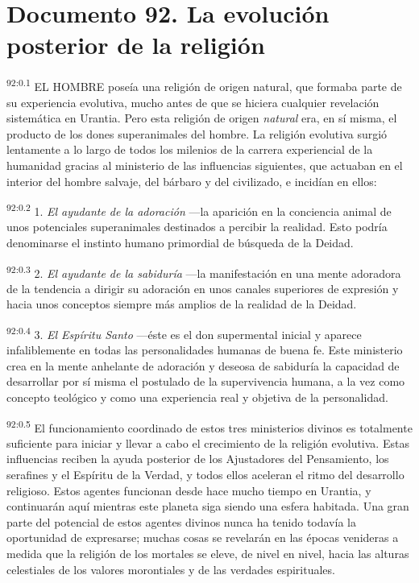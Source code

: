 \chapter{Documento 92. La evolución posterior de la religión}
\par
\textsuperscript{92:0.1} EL HOMBRE poseía una religión de origen natural, que formaba parte de su experiencia evolutiva, mucho antes de que se hiciera cualquier revelación sistemática en Urantia. Pero esta religión de origen \textit{natural} era, en sí misma, el producto de los dones superanimales del hombre. La religión evolutiva surgió lentamente a lo largo de todos los milenios de la carrera experiencial de la humanidad gracias al ministerio de las influencias siguientes, que actuaban en el interior del hombre salvaje, del bárbaro y del civilizado, e incidían en ellos:

\par
\textsuperscript{92:0.2} 1. \textit{El ayudante de la adoración} ---la aparición en la conciencia animal de unos potenciales superanimales destinados a percibir la realidad. Esto podría denominarse el instinto humano primordial de búsqueda de la Deidad.

\par
\textsuperscript{92:0.3} 2. \textit{El ayudante de la sabiduría} ---la manifestación en una mente adoradora de la tendencia a dirigir su adoración en unos canales superiores de expresión y hacia unos conceptos siempre más amplios de la realidad de la Deidad.

\par
\textsuperscript{92:0.4} 3. \textit{El Espíritu Santo} ---éste es el don supermental inicial y aparece infaliblemente en todas las personalidades humanas de buena fe. Este ministerio crea en la mente anhelante de adoración y deseosa de sabiduría la capacidad de desarrollar por sí misma el postulado de la supervivencia humana, a la vez como concepto teológico y como una experiencia real y objetiva de la personalidad.

\par
\textsuperscript{92:0.5} El funcionamiento coordinado de estos tres ministerios divinos es totalmente suficiente para iniciar y llevar a cabo el crecimiento de la religión evolutiva. Estas influencias reciben la ayuda posterior de los Ajustadores del Pensamiento, los serafines y el Espíritu de la Verdad, y todos ellos aceleran el ritmo del desarrollo religioso. Estos agentes funcionan desde hace mucho tiempo en Urantia, y continuarán aquí mientras este planeta siga siendo una esfera habitada. Una gran parte del potencial de estos agentes divinos nunca ha tenido todavía la oportunidad de expresarse; muchas cosas se revelarán en las épocas venideras a medida que la religión de los mortales se eleve, de nivel en nivel, hacia las alturas celestiales de los valores morontiales y de las verdades espirituales.

